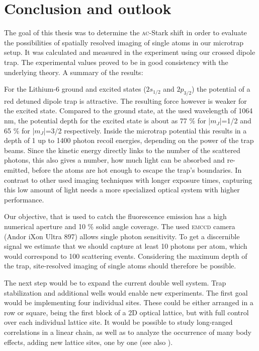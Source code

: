 \chapter{Conclusion and outlook}

The goal of this thesis was to determine the \textsc{ac}-Stark shift in order to evaluate the possibilities of spatially resolved imaging of single atoms in our microtrap setup. It was calculated and measured in the experiment using our crossed dipole trap. The experimental values proved to be in good consistency with the underlying theory. A summary of the results:

For the Lithium-6 ground and excited states ($2s_{1/2}$ and $2p_{3/2}$) the potential of a red detuned dipole trap is attractive. The resulting force however is weaker for the excited state. Compared to the ground state, at the used wavelength of 1064 nm, the potential depth for the excited state is  about as 77 \% for |$m_J$|=1/2 and 65 \% for |$m_J$|=3/2 respectively. Inside the microtrap potential this results in a depth of 1 up to 1400 photon recoil energies, depending on the power of the trap beams. Since the kinetic energy directly links to the number of the scattered photons, this also gives a number, how much light can be absorbed and re-emitted, before the atoms are hot enough to escape the trap's boundaries. In contrast to other used imaging techniques with longer exposure times, capturing this low amount of light needs a more specialized optical system with higher performance.

Our objective, that is used to catch the fluorescence emission has a high numerical aperture and 10 \% solid angle coverage. The used \textsc{emccd} camera (Andor iXon Ultra 897) allows single photon sensitivity. To get a discernible signal we estimate that we should capture at least 10 photons per atom, which would correspond to 100 scattering events. Considering the maximum depth of the trap, site-resolved imaging of single atoms should therefore be possible.

The next step would be to expand the current double well system. Trap stabilization and additional wells would enable new experiments. The first goal would be implementing four individual sites. These could be either arranged in a row or square, being the first block of a 2D optical lattice, but with full control over each individual lattice site. It would be possible to study long-ranged correlations in a linear chain, as well as to analyze the occurrence of many body effects, adding new lattice sites, one by one (see also \cite{dwave}). 





